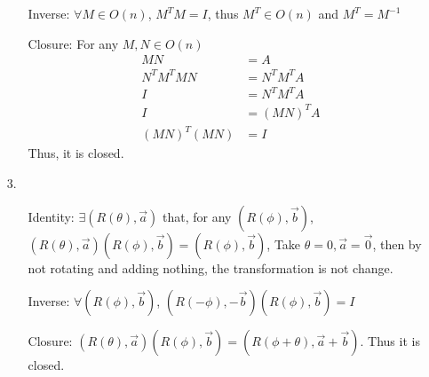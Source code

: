 \documentclass{article}
\begin{document}
\begin{itemize}
\begin{itemize}
            \item [Inverse:] \(\forall M \in O(n)\), \(M^TM = I\), thus \(M^T\in O(n)\) and \(M^T = M^{-1}\)
            \item [Closure:] For any \(M,N\in O(n)\) \begin{align*}
                MN &= A\\
                N^TM^TMN &= N^TM^TA\\
                I&=N^TM^TA\\
                I&= (MN)^TA\\
                (MN)^T (MN) &= I
            \end{align*}
            Thus, it is closed.
        \end{itemize}
    \item [3.] \
    \begin{itemize}
        \item [Identity:] \(\exists (R(\theta),\overrightarrow{a})\) that, for any \((R(\phi),\overrightarrow{b})\), \((R(\theta),\overrightarrow{a})(R(\phi),\overrightarrow{b}) =(R(\phi),\overrightarrow{b})\), Take \(\theta=0,\overrightarrow{a} = \overrightarrow{0}\), then by not rotating and adding nothing, the transformation is not change.
        \item [Inverse:] \(\forall (R(\phi),\overrightarrow{b})\), \((R(-\phi),-\overrightarrow{b})(R(\phi),\overrightarrow{b}) = I\)
        \item [Closure:] \((R(\theta),\overrightarrow{a})(R(\phi),\overrightarrow{b})=(R(\phi+\theta),\overrightarrow{a}+\overrightarrow{b})\). Thus it is closed.
    \end{itemize}
\end{itemize}
\end{document}
